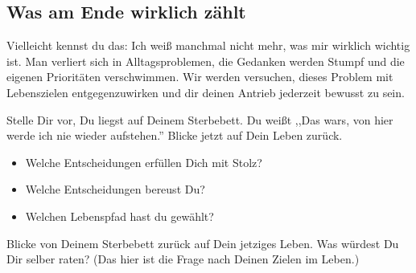 \documentclass[../Lebensziel.tex]{subfiles}
\begin{document}
\newpage
\subsection*{Was am Ende wirklich zählt}
Vielleicht kennst du das: Ich weiß manchmal nicht mehr, was mir wirklich wichtig ist. Man verliert sich in Alltagsproblemen, die Gedanken werden Stumpf und die eigenen Prioritäten verschwimmen. Wir werden versuchen, dieses Problem mit Lebenszielen entgegenzuwirken und dir deinen Antrieb jederzeit bewusst zu sein.

Stelle Dir vor, Du liegst auf Deinem Sterbebett. Du weißt ,,Das wars, von hier werde ich nie wieder aufstehen.''
Blicke jetzt auf Dein Leben zurück.
\begin{itemize}
    \item Welche Entscheidungen erfüllen Dich mit Stolz?
    \item Welche Entscheidungen bereust Du?
    \item Welchen Lebenspfad hast du gewählt?
\end{itemize}

Blicke von Deinem Sterbebett zurück auf Dein jetziges Leben. Was würdest Du Dir selber raten?
(Das hier ist die Frage nach Deinen Zielen im Leben.)
\end{document}
